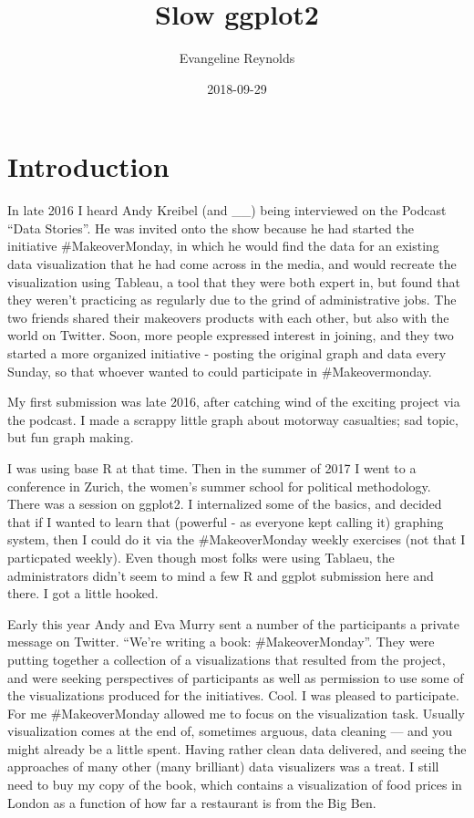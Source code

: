 \documentclass[]{book}
\title{Slow ggplot2}
\author{Evangeline Reynolds}
\date{2018-09-29}
\theoremstyle{definition}
\theoremstyle{definition}
\theoremstyle{definition}
\theoremstyle{remark}
\begin{document}
\maketitle

{
\setcounter{tocdepth}{1}
\tableofcontents
}
\chapter{Introduction}\label{intro}

In late 2016 I heard Andy Kreibel (and \_\_) being interviewed on the
Podcast ``Data Stories''. He was invited onto the show because he had
started the initiative \#MakeoverMonday, in which he would find the data
for an existing data visualization that he had come across in the media,
and would recreate the visualization using Tableau, a tool that they
were both expert in, but found that they weren't practicing as regularly
due to the grind of administrative jobs. The two friends shared their
makeovers products with each other, but also with the world on Twitter.
Soon, more people expressed interest in joining, and they two started a
more organized initiative - posting the original graph and data every
Sunday, so that whoever wanted to could participate in \#Makeovermonday.

My first submission was late 2016, after catching wind of the exciting
project via the podcast. I made a scrappy little graph about motorway
casualties; sad topic, but fun graph making.

I was using base R at that time. Then in the summer of 2017 I went to a
conference in Zurich, the women's summer school for political
methodology. There was a session on ggplot2. I internalized some of the
basics, and decided that if I wanted to learn that (powerful - as
everyone kept calling it) graphing system, then I could do it via the
\#MakeoverMonday weekly exercises (not that I particpated weekly). Even
though most folks were using Tablaeu, the administrators didn't seem to
mind a few R and ggplot submission here and there. I got a little
hooked.

Early this year Andy and Eva Murry sent a number of the participants a
private message on Twitter. ``We're writing a book: \#MakeoverMonday''.
They were putting together a collection of a visualizations that
resulted from the project, and were seeking perspectives of participants
as well as permission to use some of the visualizations produced for the
initiatives. Cool. I was pleased to participate. For me \#MakeoverMonday
allowed me to focus on the visualization task. Usually visualization
comes at the end of, sometimes arguous, data cleaning --- and you might
already be a little spent. Having rather clean data delivered, and
seeing the approaches of many other (many brilliant) data visualizers
was a treat. I still need to buy my copy of the book, which contains a
visualization of food prices in London as a function of how far a
restaurant is from the Big Ben.
\end{document}
